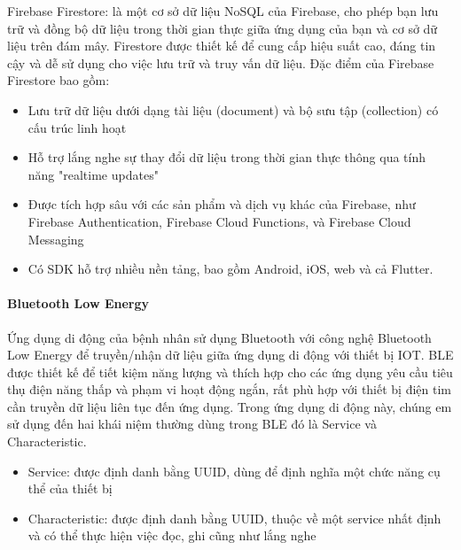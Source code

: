 Firebase Firestore: là một cơ sở dữ liệu NoSQL của Firebase, cho phép bạn lưu trữ và đồng bộ dữ liệu trong thời gian thực giữa ứng dụng của bạn và cơ sở dữ liệu trên đám mây. Firestore được thiết kế để cung cấp hiệu suất cao, đáng tin cậy và dễ sử dụng cho việc lưu trữ và truy vấn dữ liệu.
Đặc điểm của Firebase Firestore bao gồm:
\begin{itemize} 
  \item Lưu trữ dữ liệu dưới dạng tài liệu (document) và bộ sưu tập (collection) có cấu trúc linh hoạt
  \item Hỗ trợ lắng nghe sự thay đổi dữ liệu trong thời gian thực thông qua tính năng "realtime updates"
  \item Được tích hợp sâu với các sản phẩm và dịch vụ khác của Firebase, như Firebase Authentication, Firebase Cloud Functions, và Firebase Cloud Messaging
  \item Có SDK hỗ trợ nhiều nền tảng, bao gồm Android, iOS, web và cả Flutter.
\end{itemize}


\paragraph{Bluetooth Low Energy}
\mbox{}

Ứng dụng di động của bệnh nhân sử dụng Bluetooth với công nghệ Bluetooth Low Energy để truyền/nhận dữ liệu giữa ứng dụng di
động với thiết bị IOT. BLE được thiết kế để tiết kiệm năng lượng và thích hợp cho các ứng dụng yêu cầu tiêu thụ điện năng thấp 
và phạm vi hoạt động ngắn, rất phù hợp với thiết bị điện tim cần truyền dữ liệu liên tục đến ứng dụng. Trong ứng dụng di động này, chúng
em sử dụng đến hai khái niệm thường dùng trong BLE đó là Service và Characteristic.


\begin{itemize} 
  \item Service: được định danh bằng UUID, dùng để định nghĩa một chức năng cụ thể của thiết bị
  \item Characteristic: được định danh bằng UUID, thuộc về một service nhất định và có thể thực hiện việc đọc, ghi cũng như lắng nghe
\end{itemize}

